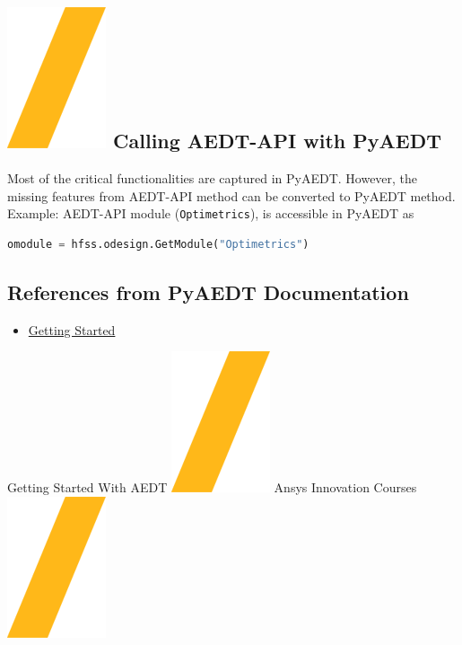 \documentclass[9pt,landscape]{article}
\begin{document}
\begin{multicols}{3}
\section{\includegraphics[height=\fontcharht\font`\S]{slash.png} Calling AEDT-API with PyAEDT}
Most of the critical functionalities are captured in PyAEDT. However, the missing features from AEDT-API method can be converted to PyAEDT method.
\newline
\\
Example: AEDT-API module (\texttt{Optimetrics}), is accessible in PyAEDT as
\begin{lstlisting}[language=Python]
omodule = hfss.odesign.GetModule("Optimetrics")
\end{lstlisting}

\subsection{References from PyAEDT Documentation}
\begin{itemize}
\item \href{https://aedt.docs.pyansys.com/version/stable/Getting_started/index.html}{Getting Started}
\end{itemize}
\end{multicols}
\vspace{-0.5cm}
\noindent\makebox[\linewidth]{\rule{\paperwidth}{4pt}}
\begin{center}
Getting Started With AEDT \includegraphics[height=\fontcharht\font`\S]{slash.png} Ansys Innovation Courses \includegraphics[height=\fontcharht\font`\S]{slash.png} %
\end{center}
\end{document}
